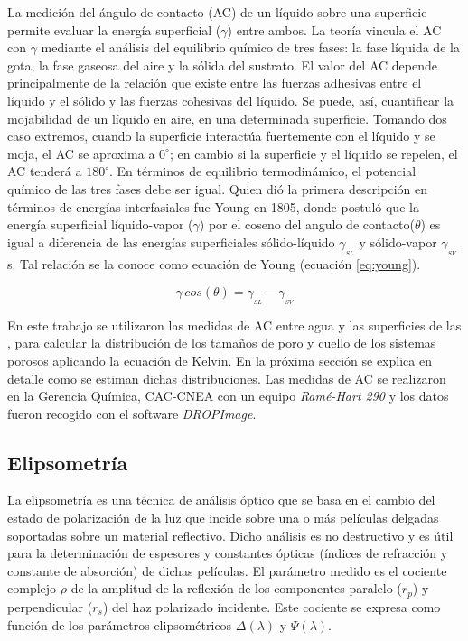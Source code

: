 		La medición del ángulo de contacto (AC) de un líquido sobre una superficie permite evaluar la energía superficial ($\gamma$) entre ambos. La teoría vincula el AC con $\gamma$ mediante el análisis del equilibrio químico de tres fases: la fase líquida de la gota, la fase gaseosa del aire y la sólida del sustrato. El valor del AC depende principalmente de la relación que existe entre las fuerzas adhesivas entre el líquido y el sólido y las fuerzas cohesivas del líquido. Se puede, así, cuantificar la mojabilidad de un líquido en aire, en una determinada superficie.\cite{findenegg1997} Tomando dos caso extremos, cuando la superficie interactúa fuertemente con el líquido y se moja, el AC se aproxima a $0^{\circ}$; en cambio si la superficie y el líquido se repelen, el AC tenderá a $180^{\circ}$. En términos de equilibrio termodinámico, el potencial químico de las tres fases  debe ser igual. Quien dió la primera descripción en términos de energías interfasiales fue Young en 1805\cite{young1805}, donde postuló que la energía superficial líquido-vapor ($\gamma$) por el coseno del angulo de contacto($\theta$) es igual a diferencia de las energías superficiales sólido-líquido $\gamma_{_{SL}}$ y sólido-vapor $\gamma_{_{SV}}$s. Tal relación se la conoce como ecuación de Young (ecuación \ref{eq:young}).

			\begin{equation}
				\gamma\, cos(\theta) = \gamma_{_{SL}} - \gamma_{_{SV}}
				\label{eq:young} 
				\end{equation}

		En este trabajo se utilizaron las medidas de AC entre agua y las superficies de las \pdm, para calcular la distribución de los tamaños de poro y cuello de los sistemas porosos aplicando la ecuación de Kelvin.\cite{Boissiere2005} En la próxima sección se explica en detalle como se estiman dichas distribuciones.
		Las medidas de AC se realizaron en la Gerencia Química, CAC-CNEA con un equipo \textit{Ramé-Hart 290} y los datos fueron recogido con el software \textit{DROPImage}.

	\subsection{Elipsometría}\label{sec:elipso}

		La elipsometría es una técnica de análisis óptico que se basa en el cambio del estado de polarización de la luz que incide sobre una o más películas delgadas soportadas sobre un material reflectivo. Dicho análisis es no destructivo y es útil para la determinación de espesores y constantes ópticas (índices de refracción y constante de absorción) de dichas películas.\cite{TompkinsHarlandG.1999,Rothen1945} El parámetro medido es el cociente complejo $\rho$ de la amplitud de la reflexión de los componentes paralelo ($r_p$) y perpendicular ($r_s$) del haz polarizado incidente. Este cociente se expresa como función de los parámetros elipsométricos $\Delta(\lambda)$ y $\Psi(\lambda)$. 

